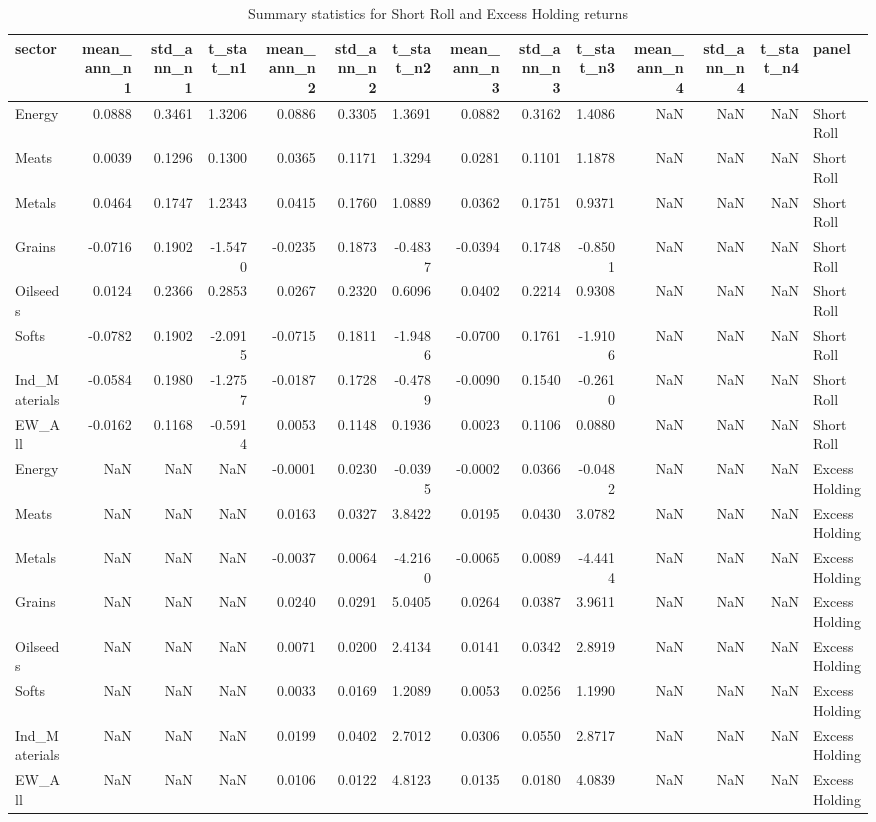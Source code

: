 \begin{table}
\caption{Summary statistics for Short Roll and Excess Holding returns}
\label{tab:table1_sr_eh}
\begin{tabular}{lrrrrrrrrrrrrl}
\toprule
sector & mean_ann_n1 & std_ann_n1 & t_stat_n1 & mean_ann_n2 & std_ann_n2 & t_stat_n2 & mean_ann_n3 & std_ann_n3 & t_stat_n3 & mean_ann_n4 & std_ann_n4 & t_stat_n4 & panel \\
\midrule
Energy & 0.0888 & 0.3461 & 1.3206 & 0.0886 & 0.3305 & 1.3691 & 0.0882 & 0.3162 & 1.4086 & NaN & NaN & NaN & Short Roll \\
Meats & 0.0039 & 0.1296 & 0.1300 & 0.0365 & 0.1171 & 1.3294 & 0.0281 & 0.1101 & 1.1878 & NaN & NaN & NaN & Short Roll \\
Metals & 0.0464 & 0.1747 & 1.2343 & 0.0415 & 0.1760 & 1.0889 & 0.0362 & 0.1751 & 0.9371 & NaN & NaN & NaN & Short Roll \\
Grains & -0.0716 & 0.1902 & -1.5470 & -0.0235 & 0.1873 & -0.4837 & -0.0394 & 0.1748 & -0.8501 & NaN & NaN & NaN & Short Roll \\
Oilseeds & 0.0124 & 0.2366 & 0.2853 & 0.0267 & 0.2320 & 0.6096 & 0.0402 & 0.2214 & 0.9308 & NaN & NaN & NaN & Short Roll \\
Softs & -0.0782 & 0.1902 & -2.0915 & -0.0715 & 0.1811 & -1.9486 & -0.0700 & 0.1761 & -1.9106 & NaN & NaN & NaN & Short Roll \\
Ind_Materials & -0.0584 & 0.1980 & -1.2757 & -0.0187 & 0.1728 & -0.4789 & -0.0090 & 0.1540 & -0.2610 & NaN & NaN & NaN & Short Roll \\
EW_All & -0.0162 & 0.1168 & -0.5914 & 0.0053 & 0.1148 & 0.1936 & 0.0023 & 0.1106 & 0.0880 & NaN & NaN & NaN & Short Roll \\
Energy & NaN & NaN & NaN & -0.0001 & 0.0230 & -0.0395 & -0.0002 & 0.0366 & -0.0482 & NaN & NaN & NaN & Excess Holding \\
Meats & NaN & NaN & NaN & 0.0163 & 0.0327 & 3.8422 & 0.0195 & 0.0430 & 3.0782 & NaN & NaN & NaN & Excess Holding \\
Metals & NaN & NaN & NaN & -0.0037 & 0.0064 & -4.2160 & -0.0065 & 0.0089 & -4.4414 & NaN & NaN & NaN & Excess Holding \\
Grains & NaN & NaN & NaN & 0.0240 & 0.0291 & 5.0405 & 0.0264 & 0.0387 & 3.9611 & NaN & NaN & NaN & Excess Holding \\
Oilseeds & NaN & NaN & NaN & 0.0071 & 0.0200 & 2.4134 & 0.0141 & 0.0342 & 2.8919 & NaN & NaN & NaN & Excess Holding \\
Softs & NaN & NaN & NaN & 0.0033 & 0.0169 & 1.2089 & 0.0053 & 0.0256 & 1.1990 & NaN & NaN & NaN & Excess Holding \\
Ind_Materials & NaN & NaN & NaN & 0.0199 & 0.0402 & 2.7012 & 0.0306 & 0.0550 & 2.8717 & NaN & NaN & NaN & Excess Holding \\
EW_All & NaN & NaN & NaN & 0.0106 & 0.0122 & 4.8123 & 0.0135 & 0.0180 & 4.0839 & NaN & NaN & NaN & Excess Holding \\
\bottomrule
\end{tabular}
\end{table}
